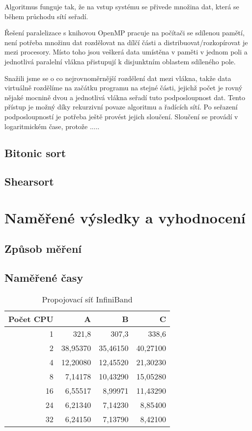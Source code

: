 \documentclass[12pt]{article}
\begin{document}
Algoritmus funguje tak, že na vstup systému se přivede množina dat, která se během průchodu sítí seřadí.

Řešení paralelizace s knihovou OpenMP pracuje na počítači se sdílenou pamětí, není potřeba množinu dat
rozdělovat na dílčí části a distribuovat/rozkopírovat je mezi procesory. Místo toho jsou veškerá data
umístěna v paměti v jednom poli a jednotlivá paralelní vlákna přistupují k disjunktním oblastem sdíleného
pole.

Snažili jsme se o co nejrovnoměrnější rozdělení dat mezi vlákna, takže data virtuálně rozdělíme na začátku
programu na stejné části, jejichž počet je rovný nějaké mocnině dvou a jednotlivá vlákna seřadí tuto podposloupnost
dat. Tento přístup je možný díky rekurzivní povaze algoritmu a řadících sítí.
Po seřazení podposloupností je potřeba ještě provést jejich sloučení. Sloučení se provádí v logaritmickém čase,
protože .....
\subsection{Bitonic sort}

\subsection{Shearsort}

\section{Naměřené výsledky a vyhodnocení}
\subsection{Způsob měření}

\subsection{Naměřené časy}

\begin{table}[H]
\begin{center}
\begin{tabular}{|r|r|r|r|}
\hline
Počet CPU & A & B & C\\
\hline
1 & 321,8 & 307,3 & 338,6\\
\hline
2 & 38,95370 & 35,46150 & 40,27100\\
\hline
4 & 12,20080 & 12,45520 & 21,30230\\
\hline
8 & 7,14178 & 10,43290 & 15,05280\\
\hline
16 & 6,55517 & 8,99971 & 11,43290\\
\hline
24 & 6,21340 & 7,14230 & 8,85400\\
\hline
32 & 6,24150 & 7,13790 & 8,42100\\
\hline
\end{tabular} 
\end{center}
\caption{Propojovací síť InfiniBand}
\end{table}
\end{document}
